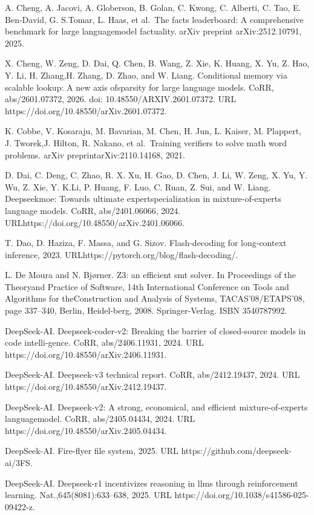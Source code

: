 \documentclass[
  10
]{article}
\begin{document}
A. Cheng, A. Jacovi, A. Globerson, B. Golan, C. Kwong, C. Alberti, C.
Tao, E. Ben-David, G. S.Tomar, L. Haas, et al.~The facts leaderboard: A
comprehensive benchmark for large languagemodel factuality. arXiv
preprint arXiv:2512.10791, 2025.

X. Cheng, W. Zeng, D. Dai, Q. Chen, B. Wang, Z. Xie, K. Huang, X. Yu, Z.
Hao, Y. Li, H. Zhang,H. Zhang, D. Zhao, and W. Liang. Conditional memory
via scalable lookup: A new axis ofsparsity for large language models.
CoRR, abs/2601.07372, 2026. doi: 10.48550/ARXIV.2601.07372. URL
https://doi.org/10.48550/arXiv.2601.07372.

K. Cobbe, V. Kosaraju, M. Bavarian, M. Chen, H. Jun, L. Kaiser, M.
Plappert, J. Tworek,J. Hilton, R. Nakano, et al.~Training verifiers to
solve math word problems. arXiv preprintarXiv:2110.14168, 2021.

D. Dai, C. Deng, C. Zhao, R. X. Xu, H. Gao, D. Chen, J. Li, W. Zeng, X.
Yu, Y. Wu, Z. Xie, Y. K.Li, P. Huang, F. Luo, C. Ruan, Z. Sui, and W.
Liang. Deepseekmoe: Towards ultimate expertspecialization in
mixture-of-experts language models. CoRR, abs/2401.06066, 2024.
URLhttps://doi.org/10.48550/arXiv.2401.06066.

T. Dao, D. Haziza, F. Massa, and G. Sizov. Flash-decoding for
long-context inference, 2023.
URLhttps://pytorch.org/blog/flash-decoding/.

L. De Moura and N. Bjørner. Z3: an efficient smt solver. In Proceedings
of the Theoryand Practice of Software, 14th International Conference on
Tools and Algorithms for theConstruction and Analysis of Systems,
TACAS'08/ETAPS'08, page 337--340, Berlin, Heidel-berg, 2008.
Springer-Verlag. ISBN 3540787992.

DeepSeek-AI. Deepseek-coder-v2: Breaking the barrier of closed-source
models in code intelli-gence. CoRR, abs/2406.11931, 2024. URL
https://doi.org/10.48550/arXiv.2406.11931.

DeepSeek-AI. Deepseek-v3 technical report. CoRR, abs/2412.19437, 2024.
URL https://doi.org/10.48550/arXiv.2412.19437.

DeepSeek-AI. Deepseek-v2: A strong, economical, and efficient
mixture-of-experts languagemodel. CoRR, abs/2405.04434, 2024. URL
https://doi.org/10.48550/arXiv.2405.04434.

DeepSeek-AI. Fire-flyer file system, 2025. URL
https://github.com/deepseek-ai/3FS.

DeepSeek-AI. Deepseek-r1 incentivizes reasoning in llms through
reinforcement learning. Nat.,645(8081):633--638, 2025. URL
https://doi.org/10.1038/s41586-025-09422-z.
\end{document}
